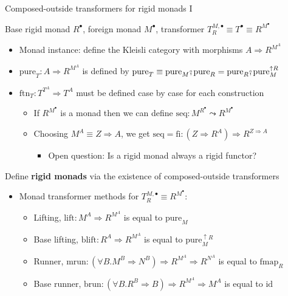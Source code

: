 \documentclass[english]{beamer}
\newcommand{\bef}{\ensuremath\raisebox{2pt}{$\mathsmaller{\mathsmaller{\circ}}$}\hspace{-3.3pt},}
\begin{document}
\begin{frame}{Composed-outside transformers for rigid monads I}

Base rigid monad $R^{\bullet}$, foreign monad $M^{\bullet}$, transformer
{\footnotesize{}$T_{R}^{M,\bullet}\equiv T^{\bullet}\equiv R^{M^{\bullet}}$}{\footnotesize\par}
\begin{itemize}
\item Monad instance: define the Kleisli category with morphisms $A\Rightarrow R^{M^{A}}$
\item $\text{pure}_{T}:A\Rightarrow R^{M^{A}}$ is defined by {\footnotesize{}$\text{pure}_{T}\equiv\text{pure}_{M}\bef\text{pure}_{R}=\text{pure}_{R}\bef\text{pure}_{M}^{\uparrow R}$}{\footnotesize\par}
\item $\text{ftn}_{T}:T^{T^{A}}\Rightarrow T^{A}$ must be defined case
by case for each construction
\begin{itemize}
\item If $R^{M^{\bullet}}$ is a monad then we can define $\text{seq}:M^{R^{\bullet}}\leadsto R^{M^{\bullet}}$
\item Choosing $M^{A}\equiv Z\Rightarrow A$, we get $\text{seq}=\text{fi}:\left(Z\Rightarrow R^{A}\right)\Rightarrow R^{Z\Rightarrow A}$
\begin{itemize}
\item Open question: Is a rigid monad always a rigid functor?
\end{itemize}
\end{itemize}
\end{itemize}
Define \textbf{rigid monads} via the existence of composed-outside
transformers
\begin{itemize}
\item Monad transformer methods for $T_{R}^{M,\bullet}\equiv R^{M^{\bullet}}$:
\begin{itemize}
\item Lifting, $\text{lift}:M^{A}\Rightarrow R^{M^{A}}$ is equal to $\text{pure}_{M}$
\item Base lifting, $\text{blift}:R^{A}\Rightarrow R^{M^{A}}$ is equal
to $\text{pure}_{M}^{\uparrow R}$
\item Runner, $\text{mrun}:\left(\forall B.M^{B}\Rightarrow N^{B}\right)\Rightarrow R^{M^{A}}\Rightarrow R^{N^{A}}$
is equal to $\text{fmap}_{R}$
\item Base runner, $\text{brun}:\left(\forall B.R^{B}\Rightarrow B\right)\Rightarrow R^{M^{A}}\Rightarrow M^{A}$
is equal to $\text{id}$

\end{itemize}
\end{itemize}
\end{frame}
\end{document}
